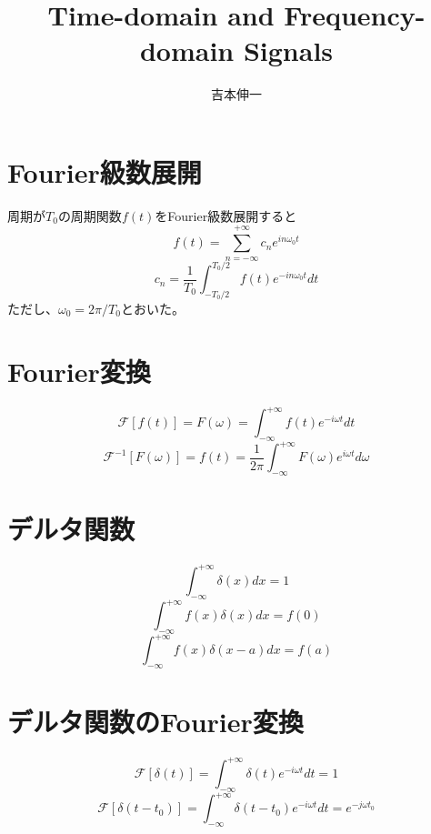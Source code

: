 \documentclass[]{jlreq}
\begin{document}
\title{Time-domain and Frequency-domain Signals}
\author{吉本伸一}
\maketitle
\tableofcontents
\clearpage

\section{Fourier級数展開}
周期が$T_0$の周期関数$f(t)$をFourier級数展開すると
%
\begin{equation}
  f(t) = \sum_{n=-\infty}^{+\infty} c_n e^{i n \omega_0 t}
\end{equation}
%
\begin{equation}
  c_n = \frac{1}{T_0} \int_{-T_0/2}^{T_0/2} f(t) e^{- i n \omega_0 t} dt
\end{equation}
%
ただし、$\omega_0 = 2\pi/T_0$とおいた。
%
\section{Fourier変換}
\begin{equation}
  \mathcal{F}[f(t)] = F(\omega) = \int_{-\infty}^{+\infty} f(t) e^{-i\omega t} dt
\end{equation}
\begin{equation}
  \mathcal{F}^{-1}[F(\omega)] = f(t) = \frac{1}{2\pi}\int_{-\infty}^{+\infty} F(\omega) e^{i\omega t} d\omega
\end{equation}

\section{デルタ関数}
\begin{equation}
  \int_{-\infty}^{+\infty} \delta (x) dx = 1
\end{equation}
%
\begin{equation}
  \int_{-\infty}^{+\infty} f(x) \delta (x) dx = f(0)
\end{equation}
%
\begin{equation}
  \int_{-\infty}^{+\infty} f(x) \delta (x - a) dx = f(a)
\end{equation}
%
\section{デルタ関数のFourier変換}
%
\begin{equation}
  \mathcal{F}[\delta (t)] = \int_{-\infty}^{+\infty} \delta (t) e^{- i \omega t} dt = 1 
\end{equation}
%
\begin{equation}
  \mathcal{F}[\delta (t - t_0)] = \int_{-\infty}^{+\infty} \delta (t - t_0) e^{- i \omega t} dt = e^{-j \omega t_0}
  \label{fd2}
\end{equation}
%
\end{document}
